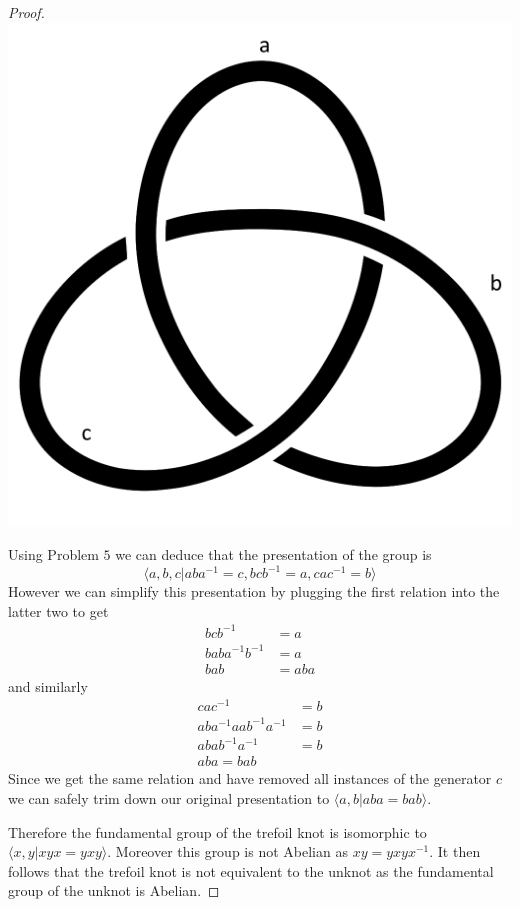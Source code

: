 \documentclass[10pt]{article}
\newcommand{\sk}{\vskip 10mm}
\theoremstyle{plain}
\theoremstyle{remark}
\begin{document}
\begin{proof}
  \includegraphics[scale=.2]{trefoil}

  Using Problem $5$ we can deduce that the presentation of the group is
  \[\langle a,b,c | aba^{-1}=c,bcb^{-1}=a,cac^{-1}=b\rangle\]
  However we can simplify this
  presentation by plugging the first relation into the latter two to get
  \begin{align*}
    bcb^{-1} &= a\\
    baba^{-1}b^{-1} &= a \\
    bab &= aba
  \end{align*}
  and similarly
  \begin{align*}
    cac^{-1} &= b\\
    aba^{-1}aab^{-1}a^{-1} &= b \\
    abab^{-1}a^{-1} &= b\\
    aba = bab
  \end{align*}
  Since we get the same relation and have removed all instances of the generator
  $c$ we can safely trim down our original presentation to
  $\langle a,b| aba=bab\rangle$.

  Therefore the fundamental group of the trefoil knot is isomorphic to
  $\langle x,y| xyx=yxy\rangle$. Moreover this group is not Abelian as
  $xy = yxyx^{-1}$. It then follows that the trefoil knot is not equivalent to the
  unknot as the fundamental group of the unknot is Abelian.
\end{proof}

\sk

\end{document}
